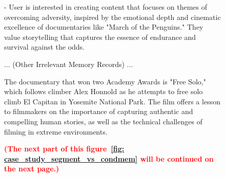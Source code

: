 \begin{figure}[htb]
\begin{tcolorbox}[left=3pt,right=3pt,top=3pt,bottom=3pt,title=\textbf{Memory generated by ConditionMem~\citep{yuan2023evolving}:}]
- User is interested in creating content that focuses on themes of overcoming adversity, inspired by the emotional depth and cinematic excellence of documentaries like "March of the Penguins." They value storytelling that captures the essence of endurance and survival against the odds.

... (Other Irrelevant Memory Records) ...
\end{tcolorbox}
\begin{tcolorbox}[left=3pt,right=3pt,top=3pt,bottom=3pt,title=\textbf{Answer (Conditional Memory):}]
The documentary that won two Academy Awards is "Free Solo," which follows climber Alex Honnold as he attempts to free solo climb El Capitan in Yosemite National Park. The film offers a lesson to filmmakers on the importance of capturing authentic and compelling human stories, as well as the technical challenges of filming in extreme environments.

\textbf{\textcolor{red}{(The next part of this figure~\ref{fig: case_study_segment_vs_condmem} will be continued on the next page.)}}
\end{tcolorbox}
\end{figure}

